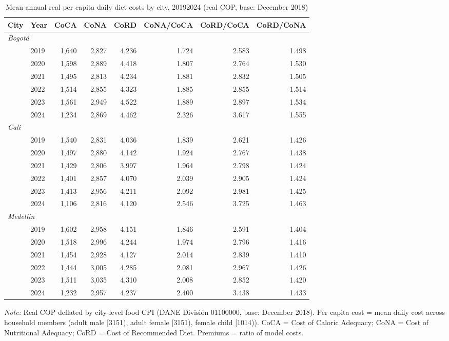 \begin{table}[htbp]
\centering
\small
\caption{Mean annual real per capita daily diet costs by city, 2019\textendash{}2024 (real COP, base: December 2018)}
\label{tab:cost_annual}
\begin{tabular}{llrrrrrr}
\toprule
City & Year & CoCA & CoNA & CoRD & \multicolumn{1}{c}{CoNA/CoCA} & \multicolumn{1}{c}{CoRD/CoCA} & \multicolumn{1}{c}{CoRD/CoNA} \\
\midrule
\multicolumn{8}{l}{\textit{Bogotá}} \\
 & 2019 & 1,640 & 2,827 & 4,236 & 1.724 & 2.583 & 1.498 \\
 & 2020 & 1,598 & 2,889 & 4,418 & 1.807 & 2.764 & 1.530 \\
 & 2021 & 1,495 & 2,813 & 4,234 & 1.881 & 2.832 & 1.505 \\
 & 2022 & 1,514 & 2,855 & 4,323 & 1.885 & 2.855 & 1.514 \\
 & 2023 & 1,561 & 2,949 & 4,522 & 1.889 & 2.897 & 1.534 \\
 & 2024 & 1,234 & 2,869 & 4,462 & 2.326 & 3.617 & 1.555 \\
\midrule
\multicolumn{8}{l}{\textit{Cali}} \\
 & 2019 & 1,540 & 2,831 & 4,036 & 1.839 & 2.621 & 1.426 \\
 & 2020 & 1,497 & 2,880 & 4,142 & 1.924 & 2.767 & 1.438 \\
 & 2021 & 1,429 & 2,806 & 3,997 & 1.964 & 2.798 & 1.424 \\
 & 2022 & 1,401 & 2,857 & 4,070 & 2.039 & 2.905 & 1.424 \\
 & 2023 & 1,413 & 2,956 & 4,211 & 2.092 & 2.981 & 1.425 \\
 & 2024 & 1,106 & 2,816 & 4,120 & 2.546 & 3.725 & 1.463 \\
\midrule
\multicolumn{8}{l}{\textit{Medellín}} \\
 & 2019 & 1,602 & 2,958 & 4,151 & 1.846 & 2.591 & 1.404 \\
 & 2020 & 1,518 & 2,996 & 4,244 & 1.974 & 2.796 & 1.416 \\
 & 2021 & 1,454 & 2,928 & 4,127 & 2.014 & 2.839 & 1.410 \\
 & 2022 & 1,444 & 3,005 & 4,285 & 2.081 & 2.967 & 1.426 \\
 & 2023 & 1,511 & 3,035 & 4,310 & 2.008 & 2.852 & 1.420 \\
 & 2024 & 1,232 & 2,957 & 4,237 & 2.400 & 3.438 & 1.433 \\
\bottomrule
\end{tabular}
\begin{minipage}{\linewidth}
\vspace{2pt}\footnotesize
\textit{Note:} Real COP deflated by city-level food CPI (DANE Divisi\'{o}n 01100000, base: December 2018). Per capita cost = mean daily cost across household members (adult male [31\textendash{}51), adult female [31\textendash{}51), female child [10\textendash{}14)). CoCA = Cost of Caloric Adequacy; CoNA = Cost of Nutritional Adequacy; CoRD = Cost of Recommended Diet. Premiums = ratio of model costs.
\end{minipage}
\end{table}

